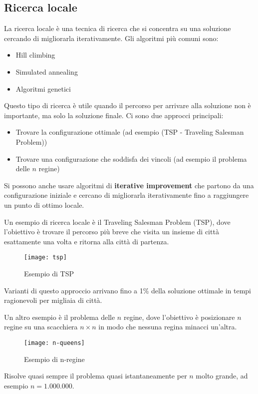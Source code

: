 \documentclass[a4paper]{article}
\begin{document}
\subsection{Ricerca locale}
La ricerca locale è una tecnica di ricerca che si concentra su una soluzione
cercando di migliorarla iterativamente. Gli algoritmi più comuni sono:
\begin{itemize}
  \item Hill climbing
  \item Simulated annealing
  \item Algoritmi genetici
\end{itemize}
Questo tipo di ricerca è utile quando il percorso per arrivare alla soluzione non è
importante, ma solo la soluzione finale. Ci sono due approcci principali:
\begin{itemize}
  \item Trovare la configurazione ottimale (ad esempio (TSP - Traveling Salesman Problem))
  \item Trovare una configurazione che soddisfa dei vincoli (ad esempio il problema delle
    \( n \) regine)
\end{itemize}
Si possono anche usare algoritmi di \textbf{iterative improvement} che partono da una
configurazione iniziale e cercano di migliorarla iterativamente fino a raggiungere
un punto di ottimo locale.
\begin{example}
  Un esempio di ricerca locale è il Traveling Salesman Problem (TSP), dove
  l'obiettivo è trovare il percorso più breve che visita un insieme di città
  esattamente una volta e ritorna alla città di partenza.
  \begin{figure}[H]
    \centering
    \texttt{[image: tsp]}
    \caption{Esempio di TSP}
  \end{figure}
  \noindent
  Varianti di questo approccio arrivano fino a 1\% della soluzione ottimale in tempi
  ragionevoli per migliaia di città.
\end{example}
\begin{example}
  Un altro esempio è il problema delle \( n \) regine, dove l'obiettivo è posizionare
  \( n \) regine su una scacchiera \( n \times n \) in modo che nessuna regina
  minacci un'altra.
  \begin{figure}[H]
    \centering
    \texttt{[image: n-queens]}
    \caption{Esempio di n-regine}
  \end{figure}
  \noindent
  Risolve quasi sempre il problema quasi istantaneamente per \( n \) molto grande,
  ad esempio \( n = 1.000.000 \).
\end{example}
\end{document}
